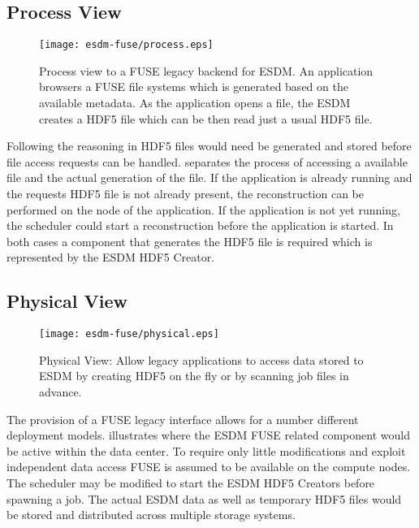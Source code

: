 \subsection{Process View}


\begin{figure}
	\centering
	\texttt{[image: esdm-fuse/process.eps]}
	\caption{Process view to a FUSE legacy backend for ESDM. An application browsers a FUSE file systems which is generated based on the available metadata. As the application opens a file, the ESDM creates a HDF5 file which can be then read just a usual HDF5 file.}
	\label{fig:esdm fuse process view}
\end{figure}

Following the reasoning in  HDF5 files would need be generated and stored before file access requests can be handled.
 separates the process of accessing a available file and the actual generation of the file.
If the application is already running and the requests HDF5 file is not already present, the reconstruction can be performed on the node of the application.
If the application is not yet running, the scheduler could start a reconstruction before the application is started.
In both cases a component that generates the HDF5 file is required which is represented by the ESDM HDF5 Creator.







\subsection{Physical View}

\begin{figure}
	\centering
	\texttt{[image: esdm-fuse/physical.eps]}
	\caption{Physical View: Allow legacy applications to access data stored to ESDM by creating HDF5 on the fly or by scanning job files in advance.}
	\label{fig:esdm fuse physical view}
\end{figure}

The provision of a FUSE legacy interface allows for a number different deployment models.
 illustrates where the ESDM FUSE related component would be active within the data center.
To require only little modifications and exploit independent data access FUSE is assumed to be available on the compute nodes.
The scheduler may be modified to start the ESDM HDF5 Creators before spawning a job.
The actual ESDM data as well as temporary HDF5 files would be stored and distributed across multiple storage systems.

